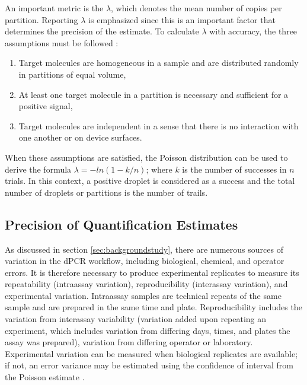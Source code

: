 An important metric is the \(\lambda\), which denotes the mean number of copies per partition. Reporting \(\lambda\) is emphasized since this is an important factor that determines the precision of the estimate. To calculate \(\lambda\) with accuracy, the three assumptions must be followed \cite{Kreutz2011}:
\begin{enumerate}
    \item Target molecules are homogeneous in a sample and are distributed randomly in partitions of equal volume,
    \item At least one target molecule in a partition is necessary and sufficient for a positive signal,
    \item Target molecules are independent in a sense that there is no interaction with one another or on device surfaces.
\end{enumerate}

When these assumptions are satisfied, the Poisson distribution can be used to derive the formula \(\lambda = -ln(1-k/n)\); where \(k\) is the number of successes in \(n\) trials. In this context, a positive droplet is considered as a success and the total number of droplets or partitions is the number of trails.


\subsection{Precision of Quantification Estimates}
\label{sec:ch2_perfeval_essentialMetrics}
As discussed in section \ref{sec:backgroundstudy}, there are numerous sources of variation in the dPCR workflow, including biological, chemical, and operator errors. It is therefore necessary to produce experimental replicates to measure its repeatability (intraassay variation), reproducibility (interassay variation), and experimental variation. Intraassay samples are technical repeats of the same sample and are prepared in the same time and plate. Reproducibility includes the variation from interassay variability (variation added upon repeating an experiment, which includes variation from differing days, times, and plates the assay was prepared), variation from differing operator or laboratory. Experimental variation can be measured when biological replicates are available; if not, an error variance may be estimated using the confidence of interval from the Poisson estimate \cite{Huggett2013_MIQEGuidelines}.

